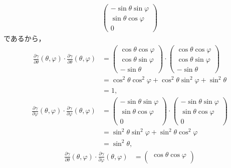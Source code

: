 \documentclass{ltjsbook}
\begin{document}
\begin{specialexample}
\begin{align*}
\begin{pmatrix}
        - \sin \theta \sin \varphi \\
        \sin \theta \cos \varphi \\
        0
    \end{pmatrix}
\end{align*}
であるから，
\begin{align*}
    \frac{\partial \gamma}{\partial \theta}(\theta, \varphi)
    \cdot
    \frac{\partial \gamma}{\partial \theta}(\theta, \varphi)
    &=
    \begin{pmatrix}
        \cos \theta \cos \varphi \\
        \cos \theta \sin \varphi \\
        - \sin \theta
    \end{pmatrix}
    \cdot
    \begin{pmatrix}
        \cos \theta \cos \varphi \\
        \cos \theta \sin \varphi \\
        - \sin \theta
    \end{pmatrix} \\
    &= \cos^2 \theta \cos^2 \varphi
        + \cos^2 \theta \sin^2 \varphi
        + \sin^2 \theta \\
    &= 1,
\end{align*}
\begin{align*}
    \frac{\partial \gamma}{\partial \varphi}(\theta, \varphi)
    \cdot
    \frac{\partial \gamma}{\partial \varphi}(\theta, \varphi)
    &=
    \begin{pmatrix}
        - \sin \theta \sin \varphi \\
        \sin \theta \cos \varphi \\
        0
    \end{pmatrix}
    \cdot
    \begin{pmatrix}
        - \sin \theta \sin \varphi \\
        \sin \theta \cos \varphi \\
        0
    \end{pmatrix} \\
    &= \sin^2 \theta \sin^2 \varphi + \sin^2 \theta \cos^2 \varphi \\
    &= \sin^2 \theta,
\end{align*}
\begin{align*}
    \frac{\partial \gamma}{\partial \theta}(\theta, \varphi)
    \cdot
    \frac{\partial \gamma}{\partial \varphi}(\theta, \varphi)
    &=
    \begin{pmatrix}
        \cos \theta \cos \varphi \\

\end{pmatrix}
\end{align*}
\end{specialexample}
\end{document}
